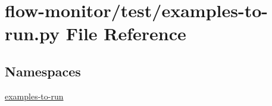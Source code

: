 \hypertarget{flow-monitor_2test_2examples-to-run_8py}{}\section{flow-\/monitor/test/examples-\/to-\/run.py File Reference}
\label{flow-monitor_2test_2examples-to-run_8py}
\subsection*{Namespaces}
\begin{DoxyCompactItemize}
\item 
 \hyperlink{namespaceexamples-to-run}{examples-\/to-\/run}
\end{DoxyCompactItemize}
